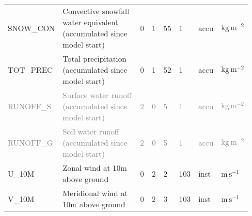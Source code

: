 \begin{longtable}{p{2.0cm}p{5.0cm}p{0.8cm}p{0.8cm}p{0.8cm}p{0.9cm}p{1cm}p{1cm}}
SNOW\_CON                      &  Convective snowfall water equivalent (accumulated since model start)                  &               0                                   &                     1                       &                    55                      &                 1                           &                      accu                   &        $\mathrm{kg\,m^{-2}}$    \\
TOT\_PREC                      &  Total precipitation (accumulated since model start)                                   &               0                                   &                     1                       &                    52                      &                 1                           &                      accu                   &        $\mathrm{kg\,m^{-2}}$  \\
\textcolor{gray}{RUNOFF\_S}    &  \textcolor{gray}{Surface water runoff (accumulated since model start)}\footnotemark[3]&               \textcolor{gray}{2}                 &                     \textcolor{gray}{0}     &                     \textcolor{gray}{5}    &                 \textcolor{gray}{1}         &                      \textcolor{gray}{accu} &        \textcolor{gray}{$\mathrm{kg\,m^{-2}}$}  \\
\textcolor{gray}{RUNOFF\_G}    &  \textcolor{gray}{Soil water runoff (accumulated since model start)}\footnotemark[3]   &               \textcolor{gray}{2}                 &                     \textcolor{gray}{0}     &                     \textcolor{gray}{5}    &                 \textcolor{gray}{1}         &                      \textcolor{gray}{accu} &        \textcolor{gray}{$\mathrm{kg\,m^{-2}}$}  \\                                      
U\_10M                         &  Zonal wind at 10m above ground                                                        &               0                                   &                     2                       &                     2                      &               103                           &                      inst                   &        $\mathrm{m\,s^{-1}}$  \\
V\_10M                         &  Meridional wind at 10m above ground                                                   &               0                                   &                     2                       &                     3                      &               103                           &                      inst                   &        $\mathrm{m\,s^{-1}}$  \\

\end{longtable}
